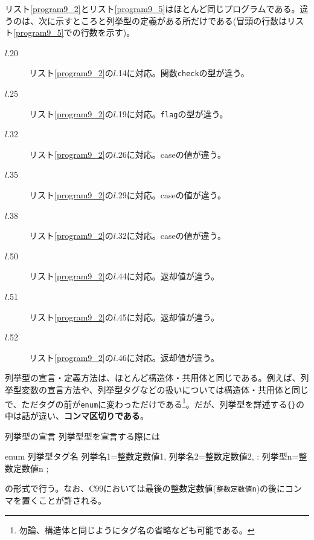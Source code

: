 リスト\ref{program9_2}とリスト\ref{program9_5}はほとんど同じプログラムである。違うのは、次に示すところと列挙型の定義がある所だけである(冒頭の行数はリスト\ref{program9_5}での行数を示す)。
\begin{description}
\item[$l$.20] リスト\ref{program9_2}の$l$.14に対応。関数\verb|check|の型が違う。
\item[$l$.25] リスト\ref{program9_2}の$l$.19に対応。\verb|flag|の型が違う。
\item[$l$.32] リスト\ref{program9_2}の$l$.26に対応。caseの値が違う。
\item[$l$.35] リスト\ref{program9_2}の$l$.29に対応。caseの値が違う。
\item[$l$.38] リスト\ref{program9_2}の$l$.32に対応。caseの値が違う。
\item[$l$.50] リスト\ref{program9_2}の$l$.44に対応。返却値が違う。
\item[$l$.51] リスト\ref{program9_2}の$l$.45に対応。返却値が違う。
\item[$l$.52] リスト\ref{program9_2}の$l$.46に対応。返却値が違う。
\end{description}

列挙型の宣言・定義方法は、ほとんど構造体・共用体と同じである。例えば、列挙型変数の宣言方法や、列挙型タグなどの扱いについては構造体・共用体と同じで、ただタグの前が\verb|enum|に変わっただけである\footnote{勿論、構造体と同じようにタグ名の省略なども可能である。}。だが、列挙型を詳述する\verb|{}|の中は話が違い、\textbf{コンマ区切りである}。
\begin{itembox}[l]{列挙型の宣言}
列挙型型を宣言する際には
\begin{code}
enum 列挙型タグ名{
  列挙名1=整数定数値1,
  列挙名2=整数定数値2,
    :
  列挙型n=整数定数値n
};
\end{code}
の形式で行う。なお、C99においては最後の整数定数値(\verb|整数定数値n|)の後にコンマを置くことが許される。
\end{itembox}

